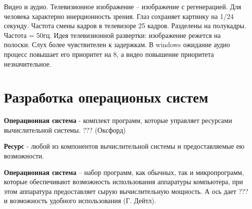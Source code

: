 Видео и аудио. Телевизионное изображение – изображение с регенерацией. Для человека характерно инерционность зрения. Глаз сохраняет картинку на 1/24 секунду. Частота смены кадров в телевизоре 25 кадров.  Разделены на полукадры. Частота = 50гц. Идея телевизионной развертки: изображение режется на полоски. Слух более чувствителен к задержкам. В windows ожидание аудио процесс повышает его приоритет на 8, а видео повышение приоритета незначительное. 

\chapter{Разработка операционых систем}

\textbf{Операционная система} - комплект программ, которые управляет ресурсами вычислительной системы. ??? (Оксфорд)

\textbf{Ресурс} - любой из компонентов вычислительной системы и предоставляемые ею возможности.

\textbf{Операционная система} – набор программ, как обычных, так и микропрограмм, которые обеспечивают возможность использования аппаратуры компьютера, при этом аппаратура предоставляет сырую вычислительную мощность. А ось дает ??? и  возможность удобного использования (Г. Дейтл). 